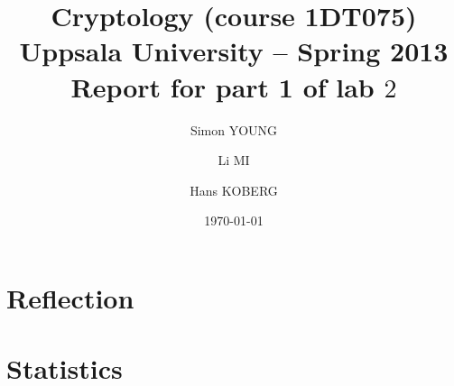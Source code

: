 \documentclass[a4paper,11pt]{article}
\title{\textbf{Cryptology (course 1DT075) \\ 
    Uppsala University -- Spring 2013 \\
    Report for part 1 of lab $2$
  }
}
\author{Simon YOUNG \and Li MI \and Hans KOBERG} %
\date{\today}
\begin{document}
\maketitle

\section{Reflection}

\section{Statistics}
\end{document}
